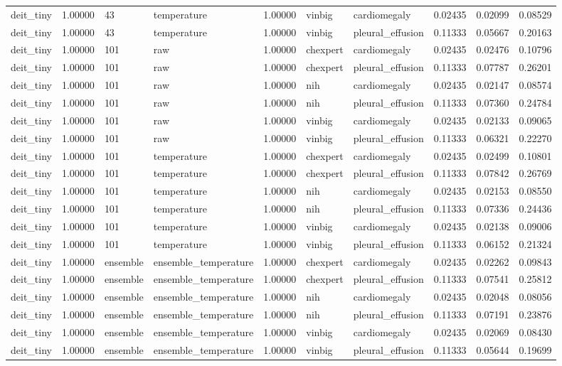 \begin{tabular}{lrllrllrrr}
deit\_tiny & 1.00000 & 43 & temperature & 1.00000 & vinbig & cardiomegaly & 0.02435 & 0.02099 & 0.08529 \\
deit\_tiny & 1.00000 & 43 & temperature & 1.00000 & vinbig & pleural\_effusion & 0.11333 & 0.05667 & 0.20163 \\
deit\_tiny & 1.00000 & 101 & raw & 1.00000 & chexpert & cardiomegaly & 0.02435 & 0.02476 & 0.10796 \\
deit\_tiny & 1.00000 & 101 & raw & 1.00000 & chexpert & pleural\_effusion & 0.11333 & 0.07787 & 0.26201 \\
deit\_tiny & 1.00000 & 101 & raw & 1.00000 & nih & cardiomegaly & 0.02435 & 0.02147 & 0.08574 \\
deit\_tiny & 1.00000 & 101 & raw & 1.00000 & nih & pleural\_effusion & 0.11333 & 0.07360 & 0.24784 \\
deit\_tiny & 1.00000 & 101 & raw & 1.00000 & vinbig & cardiomegaly & 0.02435 & 0.02133 & 0.09065 \\
deit\_tiny & 1.00000 & 101 & raw & 1.00000 & vinbig & pleural\_effusion & 0.11333 & 0.06321 & 0.22270 \\
deit\_tiny & 1.00000 & 101 & temperature & 1.00000 & chexpert & cardiomegaly & 0.02435 & 0.02499 & 0.10801 \\
deit\_tiny & 1.00000 & 101 & temperature & 1.00000 & chexpert & pleural\_effusion & 0.11333 & 0.07842 & 0.26769 \\
deit\_tiny & 1.00000 & 101 & temperature & 1.00000 & nih & cardiomegaly & 0.02435 & 0.02153 & 0.08550 \\
deit\_tiny & 1.00000 & 101 & temperature & 1.00000 & nih & pleural\_effusion & 0.11333 & 0.07336 & 0.24436 \\
deit\_tiny & 1.00000 & 101 & temperature & 1.00000 & vinbig & cardiomegaly & 0.02435 & 0.02138 & 0.09006 \\
deit\_tiny & 1.00000 & 101 & temperature & 1.00000 & vinbig & pleural\_effusion & 0.11333 & 0.06152 & 0.21324 \\
deit\_tiny & 1.00000 & ensemble & ensemble\_temperature & 1.00000 & chexpert & cardiomegaly & 0.02435 & 0.02262 & 0.09843 \\
deit\_tiny & 1.00000 & ensemble & ensemble\_temperature & 1.00000 & chexpert & pleural\_effusion & 0.11333 & 0.07541 & 0.25812 \\
deit\_tiny & 1.00000 & ensemble & ensemble\_temperature & 1.00000 & nih & cardiomegaly & 0.02435 & 0.02048 & 0.08056 \\
deit\_tiny & 1.00000 & ensemble & ensemble\_temperature & 1.00000 & nih & pleural\_effusion & 0.11333 & 0.07191 & 0.23876 \\
deit\_tiny & 1.00000 & ensemble & ensemble\_temperature & 1.00000 & vinbig & cardiomegaly & 0.02435 & 0.02069 & 0.08430 \\
deit\_tiny & 1.00000 & ensemble & ensemble\_temperature & 1.00000 & vinbig & pleural\_effusion & 0.11333 & 0.05644 & 0.19699 \\
\bottomrule
\end{tabular}
